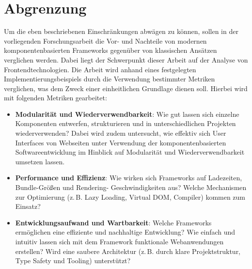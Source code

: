 \documentclass[oneside]{ausarbeitung}
\begin{document}
\section{Abgrenzung}
Um die eben beschriebenen Einschränkungen abwägen zu können, sollen in der vorliegenden Forschungsarbeit die Vor- und Nachteile von modernen komponentenbasierten Frameworks gegenüber von klassischen Ansätzen verglichen werden. Dabei liegt der Schwerpunkt dieser Arbeit auf der Analyse von Frontendtechnologien. 
Die Arbeit wird anhand eines festgelegten Implementierungsbeispiels durch die Verwendung bestimmter Metriken verglichen, was dem Zweck einer einheitlichen Grundlage dienen soll. Hierbei wird mit folgenden Metriken gearbeitet: 
\begin{itemize}
    \item \textbf{Modularität und Wiederverwendbarkeit}:  
Wie gut lassen sich einzelne Komponenten entwerfen, strukturieren und in unterschiedlichen Projekten wiederverwenden? Dabei wird zudem untersucht, wie effektiv sich User Interfaces von Webseiten unter Verwendung der komponentenbasierten Softwareentwicklung im Hinblick auf Modularität und Wiederverwendbarkeit umsetzen lassen.
    \item \textbf{Performance und Effizienz}:  
          Wie wirken sich Frameworks auf Ladezeiten, Bundle-Größen und Rendering- Geschwindigkeiten aus?
          Welche Mechanismen zur Optimierung (z.\,B. Lazy Loading, Virtual DOM, Compiler) kommen zum Einsatz?
    \item \textbf{Entwicklungsaufwand und Wartbarkeit}:  
          Welche Frameworks ermöglichen eine effiziente und nachhaltige Entwicklung?
                    Wie einfach und intuitiv lassen sich mit dem Framework funktionale Webanwendungen erstellen?
          Wird eine saubere Architektur (z.\,B. durch klare Projektstruktur, Type Safety und Tooling) unterstützt?
\end{itemize}
\end{document}
